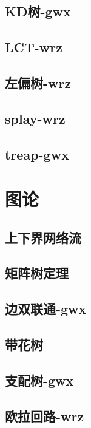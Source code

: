 \documentclass[titlepage,a4paper,10pt]{article}
\begin{document}
\begin{spacing}{0.8}
			\subsection{KD树-gwx}
				
			\subsection{LCT-wrz}
				
			\subsection{左偏树-wrz}
				
			\subsection{splay-wrz}
				
			\subsection{treap-gwx}
				
		\section{图论}
			\subsection{上下界网络流}
				
			\subsection{矩阵树定理}
				
			\subsection{边双联通-gwx}
				
			\subsection{带花树}
				
			\subsection{支配树-gwx}
				
			\subsection{欧拉回路-wrz}
				

\end{spacing}
\end{document}
